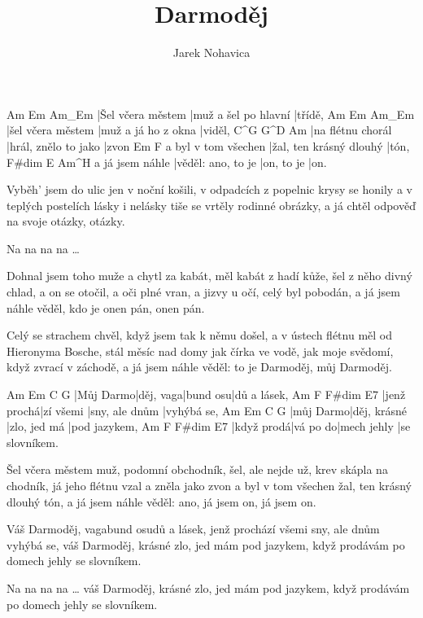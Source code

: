 \documentclass{song}
\author{Jarek Nohavica}
\title{Darmoděj}
\begin{document}
\strophe
Am                Em                   Am_Em
|Šel včera městem |muž a šel po hlavní |třídě,
Am                Em                  Am_Em
|šel včera městem |muž a já ho z okna |viděl,
C^G               G^D                  Am
|na flétnu chorál |hrál, znělo to jako |zvon
                    Em                      F
a byl v tom všechen |žal, ten krásný dlouhý |tón,
                F#dim              E           Am^H
a já jsem náhle |věděl: ano, to je |on, to je |on.
\endstrophe

\strophe*
Vyběh' jsem do ulic jen v noční košili,
v odpadcích z popelnic krysy se honily
a v teplých postelích lásky i nelásky
tiše se vrtěly rodinné obrázky,
a já chtěl odpověď na svoje otázky, otázky.
\endstrophe

Na na na na \ldots
\endstrophe

\strophe*
Dohnal jsem toho muže a chytl za kabát,
měl kabát z hadí kůže, šel z něho divný chlad,
a on se otočil, a oči plné vran,
a jizvy u očí, celý byl pobodán,
a já jsem náhle věděl, kdo je onen pán, onen pán.
\endstrophe

\strophe*
Celý se strachem chvěl, když jsem tak k němu došel,
a v ústech flétnu měl od Hieronyma Bosche,
stál měsíc nad domy jak čírka ve vodě,
jak moje svědomí, když zvrací v záchodě,
a já jsem náhle věděl: to je Darmoděj, můj Darmoděj.
\endstrophe

Am        Em        C        G
|Můj Darmo|děj, vaga|bund osu|dů a lásek,
Am          F         F#dim          E7
|jenž prochá|zí všemi |sny, ale dnům |vyhýbá se,
Am        Em           C            G
|můj Darmo|děj, krásné |zlo, jed má |pod jazykem,
Am         F        F#dim       E7
|když prodá|vá po do|mech jehly |se slovníkem.
\endstrophe

\strophe*
Šel včera městem muž, podomní obchodník,
šel, ale nejde už, krev skápla na chodník,
já jeho flétnu vzal a zněla jako zvon
a byl v tom všechen žal, ten krásný dlouhý tón,
a já jsem náhle věděl: ano, já jsem on, já jsem on.
\endstrophe

Váš Darmoděj, vagabund osudů a lásek,
jenž prochází všemi sny, ale dnům vyhýbá se,
váš Darmoděj, krásné zlo, jed mám pod jazykem,
když prodávám po domech jehly se slovníkem.
\endstrophe

Na na na na \ldots
váš Darmoděj, krásné zlo, jed mám pod jazykem,
když prodávám po domech jehly se slovníkem.
\endstrophe
\end{document}

